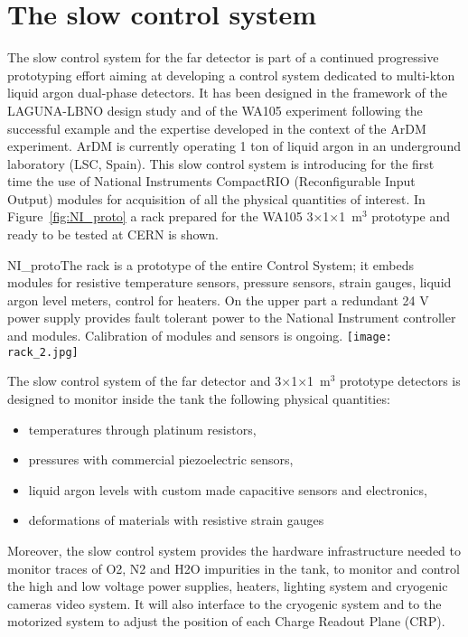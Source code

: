 \section{The slow control system} 
\label{sec:detectors-fd-alt-dcs}

The slow control system for the far detector is part of a continued
progressive prototyping effort aiming at developing a control system
dedicated to multi-kton liquid argon dual-phase detectors. It has
been designed in the framework of the LAGUNA-LBNO design study and of
the WA105 experiment following the successful example and the
expertise developed in the context of the ArDM
experiment\cite{Badertscher:2013ygt}. ArDM is currently operating 1
ton of liquid argon in an underground laboratory (LSC, Spain). This
slow control system is introducing for the first time the use of
National Instruments CompactRIO (Reconfigurable Input Output) modules
for acquisition of all the physical quantities of interest. In
Figure~\ref{fig:NI_proto} a rack prepared for the WA105
3$\times$1$\times$1~m$^3$ prototype and ready to be tested at CERN is
shown.
\begin{cdrfigure}{NI_proto}{The rack is a prototype of the entire Control System; it  embeds modules for resistive temperature sensors, pressure  sensors, strain gauges, liquid argon level meters, control for  heaters. On the upper part a redundant 24 V power supply provides
 fault tolerant power to the National Instrument controller and modules. Calibration of modules and sensors is ongoing.}
\texttt{[image: rack\_2.jpg]}
\end{cdrfigure}

The slow control system of the far detector and
3$\times$1$\times$1~m$^3$ prototype detectors is designed to monitor
inside the tank the following physical quantities:
\begin{itemize}
 \item temperatures through platinum resistors,
 \item pressures with commercial piezoelectric sensors,
 \item liquid argon levels with custom made capacitive sensors and electronics,
 \item deformations of materials with resistive strain gauges
\end{itemize} 

Moreover, the slow control system provides the hardware infrastructure
needed to monitor traces of O2, N2 and H2O impurities in the tank, to
monitor and control the high and low voltage power supplies, heaters,
lighting system and cryogenic cameras video system. It will also
interface to the cryogenic system and to the motorized system to
adjust the position of each Charge Readout Plane (CRP).

